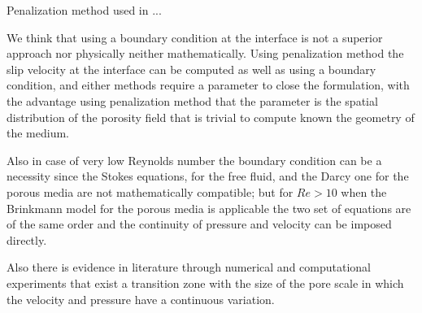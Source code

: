 Penalization method \citet{angot1999penalization} used in\cite{bruneau2004passive} \cite{bruneau2008numerical} \cite{bruneau2010coupling}...


We think that using a boundary condition at the interface is not a superior approach nor physically neither mathematically.
Using penalization method the slip velocity at the interface can be computed as well as using a boundary condition, and either methods require a parameter to close the formulation, with the advantage using penalization method that the parameter is the spatial distribution of the porosity field that is trivial to compute known the geometry of the medium.

Also in case of very low Reynolds number the boundary condition can be a necessity since the Stokes equations, for the free fluid, and the Darcy one for the porous media are not mathematically compatible; but for $Re>10$ when the Brinkmann model for the porous media is applicable the two set of equations are of the same order and the continuity of pressure and velocity can be imposed directly.

Also there is evidence in literature through numerical and computational experiments \citet{ochoa2017fluid} that exist a transition zone with the size of the pore scale in which the velocity and pressure have a continuous variation.
